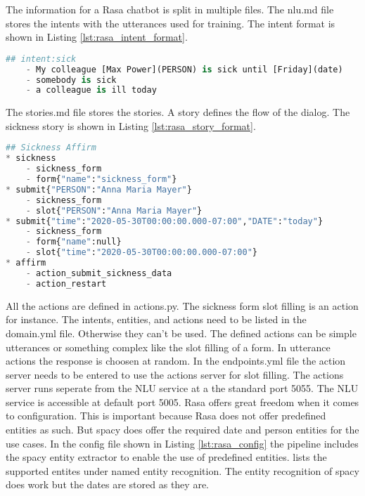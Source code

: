 The information for a Rasa chatbot is split in multiple files.
The nlu.md file stores the intents with the utterances used for training.
The intent format is shown in Listing \ref{lst:rasa_intent_format}.
\begin{lstlisting}[caption={Rasa Intent Format}, label={lst:rasa_intent_format},captionpos=b,frame=single,language={Python},commentstyle=\color{mygreen},keywordstyle=\color{blue},
    morekeywords={}]                
## intent:sick
    - My colleague [Max Power](PERSON) is sick until [Friday](date)
    - somebody is sick 
    - a colleague is ill today
\end{lstlisting} 
The stories.md file stores the stories. 
A story defines the flow of the dialog.
The sickness story is shown in Listing \ref{lst:rasa_story_format}.
\begin{lstlisting}[caption={Rasa Story Format}, label={lst:rasa_story_format},captionpos=b,frame=single,language={Python},commentstyle=\color{mygreen},keywordstyle=\color{blue},
    morekeywords={sickness, submit, affirm}]                
## Sickness Affirm
* sickness
    - sickness_form
    - form{"name":"sickness_form"}
* submit{"PERSON":"Anna Maria Mayer"}
    - sickness_form
    - slot{"PERSON":"Anna Maria Mayer"}
* submit{"time":"2020-05-30T00:00:00.000-07:00","DATE":"today"}
    - sickness_form
    - form{"name":null}
    - slot{"time":"2020-05-30T00:00:00.000-07:00"}
* affirm
    - action_submit_sickness_data
    - action_restart
\end{lstlisting} 
All the actions are defined in actions.py.
The sickness form slot filling is an action for instance.
The intents, entities, and actions need to be listed in the domain.yml file.
Otherwise they can't be used. 
The defined actions can be simple utterances or something complex like the slot 
filling of a form.
In utterance actions the response is choosen at random.
In the endpoints.yml file the action server needs to be entered to use the 
actions server for slot filling.
The actions server runs seperate from the NLU service at a the standard port 5055.
The NLU service is accessible at default port 5005.
Rasa offers great freedom when it comes to configuration.
This is important because Rasa does not offer predefined entities as such.
But spacy does offer the required date and person entities for the use cases.
In the config file shown in Listing \ref{lst:rasa_config} the pipeline includes 
the spacy entity extractor to enable the use of predefined entities.
\citet{spacyapi} lists the supported entites under named entity recognition.
The entity recognition of spacy does work but the dates are stored as they are.
